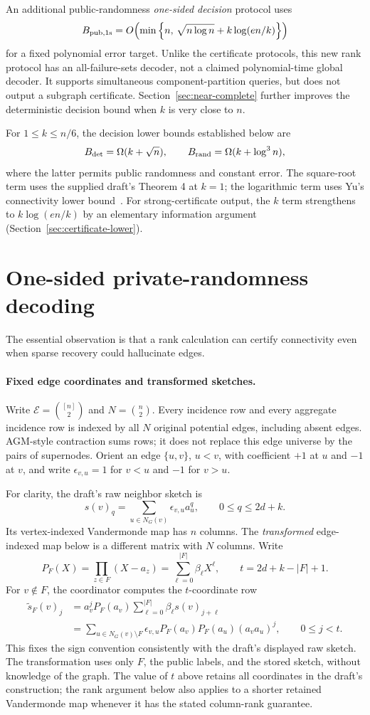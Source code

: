 \documentclass[11pt]{article}
\theoremstyle{remark}\newtheorem{remark}[theorem]{Remark}
\begin{document}
An additional public-randomness \emph{one-sided decision} protocol uses
\[
 B_{\rm pub,1s}=O\!\left(\min\left\{n,\,
 \sqrt{n\log n}+k\log(en/k)\right\}\right)
\]
for a fixed polynomial error target. Unlike the certificate protocols, this new rank protocol has an all-failure-sets decoder, not a claimed polynomial-time global decoder. It supports simultaneous component-partition queries, but does not output a subgraph certificate. Section~\ref{sec:near-complete} further improves the deterministic decision bound when $k$ is very close to $n$.

For $1\le k\le n/6$, the decision lower bounds established below are
\[
 B_{\rm det}=\Omega(k+\sqrt n),\qquad
 B_{\rm rand}=\Omega(k+\log^3n),
\]
where the latter permits public randomness and constant error. The square-root term uses the supplied draft's Theorem 4 at $k=1$; the logarithmic term uses Yu's connectivity lower bound~\cite{Yu21}. For strong-certificate output, the $k$ term strengthens to $k\log(en/k)$ by an elementary information argument (Section~\ref{sec:certificate-lower}).

\section{One-sided private-randomness decoding}
The essential observation is that a rank calculation can certify connectivity even when sparse recovery could hallucinate edges.

\paragraph{Fixed edge coordinates and transformed sketches.}
Write $\mathcal E=\binom{[n]}2$ and $N=\binom n2$. Every incidence row and every aggregate incidence row is indexed by all $N$ original potential edges, including absent edges. AGM-style contraction sums rows; it does not replace this edge universe by the pairs of supernodes. Orient an edge $\{u,v\}$, $u<v$, with coefficient $+1$ at $u$ and $-1$ at $v$, and write $\epsilon_{v,u}=1$ for $v<u$ and $-1$ for $v>u$.

For clarity, the draft's raw neighbor sketch is
\[
 s(v)_q=\sum_{u\in N_G(v)}\epsilon_{v,u}a_u^q,
 \qquad 0\le q\le 2d+k.
\]
Its vertex-indexed Vandermonde map has $n$ columns. The \emph{transformed} edge-indexed map below is a different matrix with $N$ columns. Write
\[
 P_F(X)=\prod_{z\in F}(X-a_z)
       =\sum_{\ell=0}^{|F|}\beta_\ell X^\ell,
 \qquad t=2d+k-|F|+1.
\]
For $v\notin F$, the coordinator computes the $t$-coordinate row
\begin{align*}
 \widetilde s_F(v)_j
 &=a_v^jP_F(a_v)\sum_{\ell=0}^{|F|}\beta_\ell s(v)_{j+\ell}\\
 &=\sum_{u\in N_G(v)\setminus F}
   \epsilon_{v,u}P_F(a_v)P_F(a_u)(a_va_u)^j,
 \qquad 0\le j<t.
\end{align*}
This fixes the sign convention consistently with the draft's displayed raw sketch. The transformation uses only $F$, the public labels, and the stored sketch, without knowledge of the graph. The value of $t$ above retains all coordinates in the draft's construction; the rank argument below also applies to a shorter retained Vandermonde map whenever it has the stated column-rank guarantee.
\end{document}
